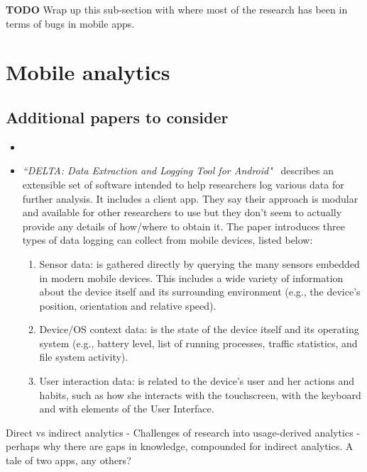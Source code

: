 \textbf{TODO} Wrap up this sub-section with where most of the research has been in terms of bugs in mobile apps.



\section{Mobile analytics}
\subsection{Additional papers to consider}
\begin{itemize}

    \item 
    \item \emph{``DELTA: Data Extraction and Logging Tool for Android"}~\citep{spolaor2018_delta_data_extraction_and_logging_tool_for_android} describes an extensible set of software intended to help researchers log various data for further analysis. It includes a client app. They say their approach is modular and available for other researchers to use but they don't seem to actually provide any details of how/where to obtain it. The paper introduces three types of data logging can collect from mobile devices, listed below:
    \begin{enumerate}
        \item Sensor data: is gathered directly by querying the many sensors embedded in modern mobile devices. This includes a wide variety of information about the device itself and its surrounding environment (e.g., the device's position, orientation and relative speed).
        \item  Device/OS context data: is the state of the device itself and its operating system (e.g., battery level, list of running processes, traffic statistics, and file system activity).
        \item User interaction data: is related to the device's user and her actions and habits, such as how she interacts with the touchscreen, with the keyboard and with elements of the User Interface.
    \end{enumerate}

\end{itemize}
Direct vs indirect analytics - 
Challenges of research into usage-derived analytics - perhaps why there are gaps in knowledge, compounded for indirect analytics. A tale of two apps, any others?